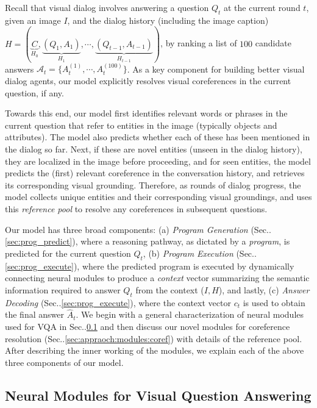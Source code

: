 \documentclass[runningheads]{llncs}
\makeatletter
\DeclareRobustCommand\onedot{\futurelet\@let@token\@onedot}
\def\@onedot{\ifx\@let@token.\else.\null\fi\xspace}
\def\Sec{Sec\onedot}
\makeatother
\begin{document}
Recall that visual dialog \cite{visdial} involves answering a
question $Q_t$ at the current round $t$, given an image $I$, and the
dialog history (including the image caption) $H = (\underbrace{C}_{H_0},
    \underbrace{(Q_1, A_1)}_{H_1}, \cdots,
    \underbrace{(Q_{t-1}, A_{t-1})}_{H_{t-1}})$, by ranking a list of 
$100$ candidate answers 
$\mathcal{A}_t = \{A_t^{(1)},\cdots,A_t^{(100)}\}$.
As a key component for building better visual dialog agents, our model
explicitly resolves visual coreferences in the current question, if
any.

Towards this end, our model first identifies relevant words or phrases in the 
current question that refer to entities in the image (typically objects and 
attributes).
The model also predicts whether each of these has been mentioned in the dialog
so far.
Next, if these are novel entities (unseen in the dialog history), they are 
localized in the image before proceeding, and for seen entities, the model 
predicts the (first) relevant coreference in the conversation history, and retrieves its corresponding visual grounding.
Therefore, as rounds of dialog progress, the model collects unique entities and
their corresponding visual groundings, and uses this \textit{reference pool} to
resolve any coreferences in subsequent questions.

Our model has three broad components:
(a) \textit{Program Generation} (\Sec\ref{sec:prog_predict}), where a reasoning
pathway, as dictated by a \textit{program},
is predicted for the current question $Q_t$,
(b) \textit{Program Execution} (\Sec\ref{sec:prog_execute}), where the
predicted program is executed by dynamically connecting neural modules
\cite{andreas_naacl16,andreas16cvpr,hu2017learning} to produce a
\textit{context} vector
summarizing the semantic information required to answer $Q_t$ from the context
($I, H$), and lastly,
(c) \textit{Answer Decoding} (\Sec\ref{sec:prog_execute}), where the
context vector $c_t$ is used to obtain the final answer $\hat{A}_t$.
We begin with a general characterization of neural modules used for VQA in \Sec\ref{sec:appraoch:modules:vqa} and then discuss our
novel modules for coreference resolution (\Sec\ref{sec:appraoch:modules:coref}) with details of the reference pool.
After describing the inner working of the modules, we explain each 
of the above three components of our model.
\subsection{Neural Modules for Visual Question Answering}
\label{sec:appraoch:modules:vqa}
\end{document}

